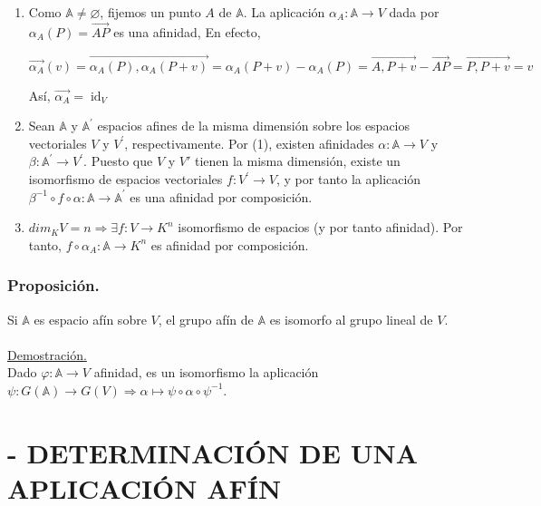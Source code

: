 \documentclass[12pt, a4paper, ones, notitlepage, openany,titlepage]{article}
\begin{document}
\begin{enumerate}
	
	\item Como $\mathbb{A}\ne\varnothing$, fijemos un punto $A$ de $\mathbb{A}$. La aplicación $\alpha_{A}: \mathbb{A} \rightarrow V$ dada por $\alpha_{A}(P)=\overrightarrow{A P}$ es una afinidad, En efecto,
	
	$$
	\overrightarrow{\alpha_{A}}(v)=\overrightarrow{\alpha_{A}(P), \alpha_{A}(P+v)}=\alpha_{A}(P+v)-\alpha_{A}(P)=\overrightarrow{A, P+v}-\overrightarrow{A P}=\overrightarrow{P, P+v}=v
	$$
	
	Así, $\overrightarrow{\alpha_{A}}=\operatorname{id}_{V}$
	
	\item Sean $\mathbb{A}$ y $\mathbb{A}^{\prime}$ espacios afines de la misma dimensión sobre los espacios vectoriales $V$ y $V^{\prime}$, respectivamente. Por (1), existen afinidades $\alpha: \mathbb{A} \rightarrow V$ y $\beta: \mathbb{A}^{\prime} \rightarrow V^{\prime}$. Puesto que $V$ y $V'$ tienen la misma dimensión, existe un isomorfismo de espacios vectoriales $f: V^{\prime} \rightarrow V$, y por tanto la aplicación $\beta^{-1} \circ f \circ \alpha: \mathbb{A} \rightarrow \mathbb{A}^{\prime}$ es una afinidad por composición.
	
	\item $dim_{K}V=n\Longrightarrow \exists f:V \longrightarrow K^{n}$ isomorfismo de espacios (y por tanto afinidad). Por tanto, $f \circ \alpha_{A}: \mathbb{A} \longrightarrow K^{n}$ es afinidad por composición.
	
\end{enumerate}

\subsubsection{Proposición.}
Si $\mathbb{A}$ es espacio afín sobre $V$, el grupo afín de $\mathbb{A}$ es isomorfo al grupo lineal de $V$.\\\\
\underline{Demostración.}\\
Dado $\varphi : \mathbb{A} \longrightarrow V$ afinidad, es un isomorfismo la aplicación $\psi : G(\mathbb{A}) \longrightarrow G(V) \Longrightarrow \alpha \longmapsto \psi \circ \alpha \circ \psi^{-1}$.

\section{- DETERMINACIÓN DE UNA APLICACIÓN AFÍN}
\end{document}
